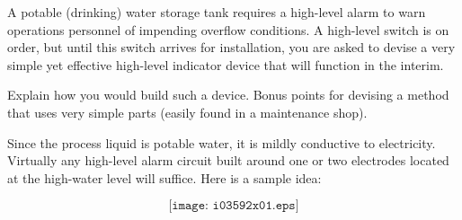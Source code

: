 

A potable (drinking) water storage tank requires a high-level alarm to warn operations personnel of impending overflow conditions.  A high-level switch is on order, but until this switch arrives for installation, you are asked to devise a very simple yet effective high-level indicator device that will function in the interim.

Explain how you would build such a device.  Bonus points for devising a method that uses very simple parts (easily found in a maintenance shop).







Since the process liquid is potable water, it is mildly conductive to electricity.  Virtually any high-level alarm circuit built around one or two electrodes located at the high-water level will suffice.  Here is a sample idea:

$$\texttt{[image: i03592x01.eps]}$$










